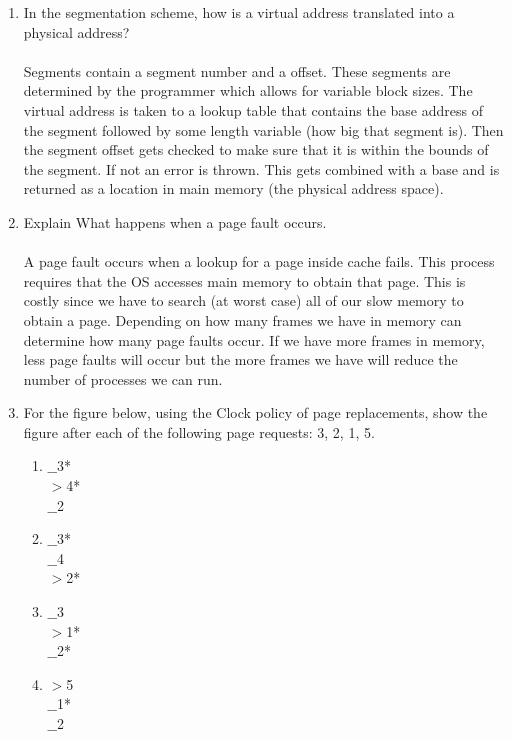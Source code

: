 \documentclass[12pt]{article}
\begin{document}
\begin{enumerate}
	\pagebreak

	\item In the segmentation scheme, how is a virtual address translated into a physical address? \\ \\
	Segments contain a segment number and a offset. These segments are determined by the programmer which allows for variable block sizes. The virtual address is taken to a lookup table that contains the base address of the segment followed by some length variable (how big that segment is). Then the segment offset gets checked to make sure that it is within the bounds of the segment. If not an error is thrown. This gets combined with a base and is returned as a location in main memory (the physical address space). \\
	
	\item Explain What happens when a page fault occurs. \\ \\
	A page fault occurs when a lookup for a page inside cache fails. This process requires that the OS accesses main memory to obtain that page. This is costly since we have to search (at worst case) all of our slow memory to obtain a page. Depending on how many frames we have in memory can determine how many page faults occur. If we have more frames in memory, less page faults will occur but the more frames we have will reduce the number of processes we can run. 
	 \\
	\item For the figure below, using the Clock policy of page replacements,
   show the figure after each of the following page requests:  3, 2, 1, 5. \\
	
	\begin{enumerate}				
		\item   $\_\_$3*\\
				$>$4*\\
				$\_\_$2\\
				
		\item   $\_\_$3*\\
				$\_\_$4\\
				$>$2*\\
				
		\item   $\_\_$3\\
				$>$1*\\
				$\_\_$2*\\
				
		\item  $>$5\\
				$\_\_$1*\\
				$\_\_$2\\
	\end{enumerate}
	
      
\end{enumerate}
\end{document}
